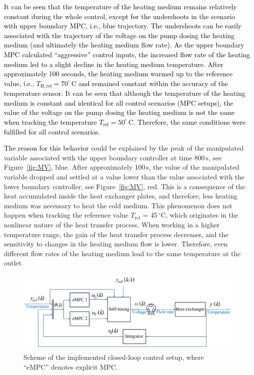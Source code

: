 \documentclass[preprint,12pt]{elsarticle}
\newcommand{\change}[1]{\textcolor{black}{#1}}
\begin{document}
\change{It can be seen that the temperature of the heating medium remains relatively constant during the whole control, except for the undershoots in the scenario with upper boundary MPC, i.e., blue trajectory. The undershoots can be easily associated with the trajectory of the voltage on the pump dosing the heating medium (and ultimately the heating medium flow rate). As the upper boundary MPC calculated ``aggressive'' control inputs, the increased flow rate of the heating medium led to a slight decline in the heating medium temperature. After approximately 100 seconds, the heating medium warmed up to the reference value, i.e., $T_{\mathrm{H, ref}} = 70^{\circ}$\,C and remained constant within the accuracy of the temperature sensor. It can be seen that although the temperature of the heating medium is constant and identical for all control scenarios (MPC setups), the value of the voltage on the pump dosing the heating medium is not the same when tracking the temperature $T_{\mathrm{ref}} = 50^{\circ}$\,C. Therefore, the same conditions were fulfilled for all control scenarios.} 

\change{The reason for this behavior} could be explained by the peak of the manipulated variable associated with the upper boundary controller at time 800\,s, see Figure~\ref{fig:MV}, blue. After approximately 100\,s, the value of the manipulated variable dropped and settled at a value lower than the value associated with the lower boundary controller, see Figure~\ref{fig:MV}, red. This is a consequence of the heat accumulated inside the heat exchanger plates, and therefore, less heating medium was necessary to heat the cold medium. This phenomenon does not happen when tracking the reference value $T_{\mathrm{ref}}$ = 45\,$^{\circ}\mathrm{C}$, which originates in the nonlinear nature of the heat transfer process. When working in a higher temperature range, the gain of the heat transfer process decreases, and the sensitivity to changes in the heating medium flow is lower. Therefore, even different flow rates of the heating medium lead to the same temperature at the outlet.

\begin{figure}
	\begin{center}
		\includegraphics[width=\textwidth]{images/cl3}
		\caption[Scheme of the implemented closed-loop control setup.]{Scheme of the implemented closed-loop control setup, where ``eMPC'' denotes explicit MPC.}
		\label{fig:CL}
	\end{center}
\end{figure}
\end{document}

